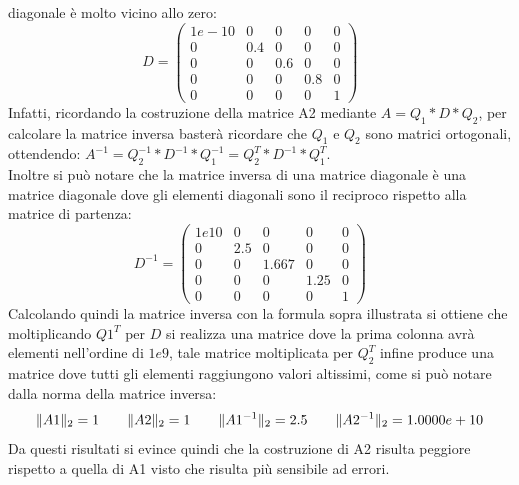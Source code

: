 \documentclass[12pt]{article}
\begin{document}
\begin{enumerate}
    diagonale è molto vicino allo zero:
    \begin{equation*} D=
        \begin{pmatrix}
            1e-10 & 0 & 0 & 0 & 0 \\
            0 & 0.4 & 0 & 0 & 0 \\
            0 & 0 & 0.6 & 0 & 0 \\
            0 & 0 & 0 & 0.8 & 0 \\
            0 & 0 & 0 & 0 & 1
        \end{pmatrix}\;\;\;\;\;
    \end{equation*}
    Infatti, ricordando la costruzione della matrice A2 mediante \(A=Q_1 * D * Q_2\), 
    per calcolare la matrice inversa basterà ricordare che \(Q_1\) e \(Q_2\) sono matrici ortogonali, ottendendo:
    \(A^{-1}=Q_2^{-1} * D^{-1} * Q_1^{-1} = Q_2^{T} * D^{-1} * Q_1^{T}\).\\
    Inoltre si può notare che la matrice inversa di una matrice diagonale è una matrice diagonale dove gli elementi diagonali sono il reciproco rispetto alla matrice di partenza:
    \begin{equation*} D^{-1}=
        \begin{pmatrix}
            1e10 & 0 & 0 & 0 & 0 \\
            0 & 2.5 & 0 & 0 & 0 \\
            0 & 0 & 1.667 & 0 & 0 \\
            0 & 0 & 0 & 1.25 & 0 \\
            0 & 0 & 0 & 0 & 1
        \end{pmatrix}\;\;\;\;\;
    \end{equation*}
    Calcolando quindi la matrice inversa con la formula sopra illustrata si ottiene che 
    moltiplicando \(Q1^{T}\) per \(D\) si realizza una matrice dove la prima colonna avrà elementi nell'ordine di \(1e9\), 
    tale matrice moltiplicata per \(Q_2^{T}\) infine produce una matrice dove tutti gli elementi 
    raggiungono valori altissimi, come si può notare dalla norma della matrice inversa:
    \begin{equation*}
    \Arrowvert A1 \Arrowvert_{2}=1 \qquad
    \Arrowvert A2 \Arrowvert_{2}=1 \qquad
    \Arrowvert A1^{-1} \Arrowvert_{2}=2.5 \qquad
    \Arrowvert A2^{-1} \Arrowvert_{2}=1.0000e+10
    \end{equation*}
    Da questi risultati si evince quindi che la costruzione di A2 risulta peggiore rispetto a quella di A1 visto che risulta più sensibile ad errori.
\end{enumerate}
\end{document}
